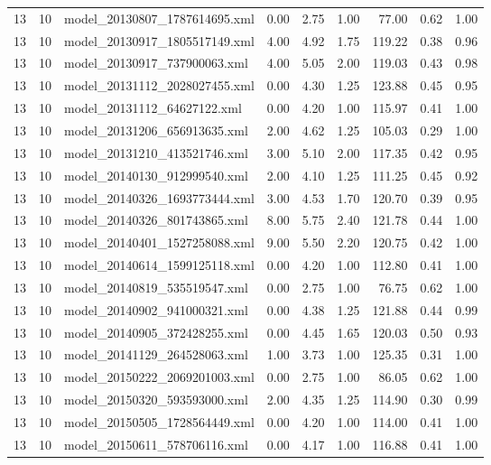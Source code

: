 \begin{table}[ht]
\begin{tabular}{rrlrrrrrr}
   13 &  10 & model\_20130807\_1787614695.xml & 0.00 & 2.75 & 1.00 & 77.00 & 0.62 & 1.00 \\ 
   13 &  10 & model\_20130917\_1805517149.xml & 4.00 & 4.92 & 1.75 & 119.22 & 0.38 & 0.96 \\ 
   13 &  10 & model\_20130917\_737900063.xml & 4.00 & 5.05 & 2.00 & 119.03 & 0.43 & 0.98 \\ 
   13 &  10 & model\_20131112\_2028027455.xml & 0.00 & 4.30 & 1.25 & 123.88 & 0.45 & 0.95 \\ 
   13 &  10 & model\_20131112\_64627122.xml & 0.00 & 4.20 & 1.00 & 115.97 & 0.41 & 1.00 \\ 
   13 &  10 & model\_20131206\_656913635.xml & 2.00 & 4.62 & 1.25 & 105.03 & 0.29 & 1.00 \\ 
   13 &  10 & model\_20131210\_413521746.xml & 3.00 & 5.10 & 2.00 & 117.35 & 0.42 & 0.95 \\ 
   13 &  10 & model\_20140130\_912999540.xml & 2.00 & 4.10 & 1.25 & 111.25 & 0.45 & 0.92 \\ 
   13 &  10 & model\_20140326\_1693773444.xml & 3.00 & 4.53 & 1.70 & 120.70 & 0.39 & 0.95 \\ 
   13 &  10 & model\_20140326\_801743865.xml & 8.00 & 5.75 & 2.40 & 121.78 & 0.44 & 1.00 \\ 
   13 &  10 & model\_20140401\_1527258088.xml & 9.00 & 5.50 & 2.20 & 120.75 & 0.42 & 1.00 \\ 
   13 &  10 & model\_20140614\_1599125118.xml & 0.00 & 4.20 & 1.00 & 112.80 & 0.41 & 1.00 \\ 
   13 &  10 & model\_20140819\_535519547.xml & 0.00 & 2.75 & 1.00 & 76.75 & 0.62 & 1.00 \\ 
   13 &  10 & model\_20140902\_941000321.xml & 0.00 & 4.38 & 1.25 & 121.88 & 0.44 & 0.99 \\ 
   13 &  10 & model\_20140905\_372428255.xml & 0.00 & 4.45 & 1.65 & 120.03 & 0.50 & 0.93 \\ 
   13 &  10 & model\_20141129\_264528063.xml & 1.00 & 3.73 & 1.00 & 125.35 & 0.31 & 1.00 \\ 
   13 &  10 & model\_20150222\_2069201003.xml & 0.00 & 2.75 & 1.00 & 86.05 & 0.62 & 1.00 \\ 
   13 &  10 & model\_20150320\_593593000.xml & 2.00 & 4.35 & 1.25 & 114.90 & 0.30 & 0.99 \\ 
   13 &  10 & model\_20150505\_1728564449.xml & 0.00 & 4.20 & 1.00 & 114.00 & 0.41 & 1.00 \\ 
   13 &  10 & model\_20150611\_578706116.xml & 0.00 & 4.17 & 1.00 & 116.88 & 0.41 & 1.00 \\ 

\end{tabular}
\end{table}
